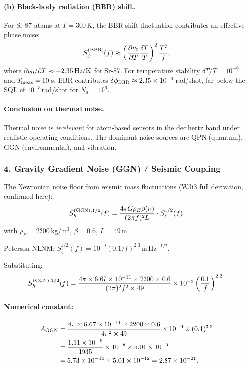 \documentclass[11pt]{article}
\theoremstyle{definition}
\theoremstyle{remark}
\newcommand{\sqrtHz}{\,\mathrm{Hz}^{-1/2}}
\newcommand{\ee}[1]{\times10^{#1}}
\begin{document}
\paragraph{(b) Black-body radiation (BBR) shift.}
For Sr-87 atoms at $T = 300$\,K, the BBR shift fluctuation contributes
an effective phase noise:
\begin{equation}
S_\phi^{(\rm BBR)}(f) \approx \left(\frac{\partial \nu_0}{\partial T}
\frac{\delta T}{T}\right)^2 \frac{T^2}{f},
\end{equation}
where $\partial\nu_0/\partial T \approx -2.35\,\rm{Hz/K}$ for Sr-87.
For temperature stability $\delta T/T = 10^{-6}$ and $T_{\rm meas} = 10$\,s,
BBR contributes $\delta\phi_{\rm BBR} \approx 2.35\ee{-6}$\,rad/shot, far below
the SQL of $10^{-3}$\,rad/shot for $N_a = 10^6$.

\paragraph{Conclusion on thermal noise.}
Thermal noise is \emph{irrelevant} for atom-based sensors in the decihertz
band under realistic operating conditions.  The dominant noise sources are
QPN (quantum), GGN (environmental), and vibration.

\subsubsection{4. Gravity Gradient Noise (GGN) / Seismic Coupling}

The Newtonian noise floor from seismic mass fluctuations (W3i3 full
derivation, confirmed here):
\begin{equation}
S_h^{(\rm GGN),1/2}(f) = \frac{4\pi G \rho_E \beta(\nu)}{(2\pi f)^2 L}
\cdot S_\xi^{1/2}(f),
\label{eq:GGN-full}
\end{equation}
with $\rho_E = 2200$\,kg/m$^3$, $\beta = 0.6$, $L = 49$\,m.

Peterson NLNM: $S_\xi^{1/2}(f) = 10^{-9}(0.1/f)^{2.3}$\,m$\sqrtHz$.

Substituting:
\begin{equation}
S_h^{(\rm GGN),1/2}(f) = \frac{4\pi \times 6.67\ee{-11} \times 2200 \times 0.6}
{(2\pi)^2 f^2 \times 49}
\times 10^{-9} \left(\frac{0.1}{f}\right)^{2.3}.
\label{eq:GGN-explicit}
\end{equation}

\paragraph{Numerical constant:}
\begin{align}
A_{\rm GGN} &= \frac{4\pi \times 6.67\ee{-11} \times 2200 \times 0.6}
{4\pi^2 \times 49}
\times 10^{-9} \times (0.1)^{2.3} \notag \\
&= \frac{1.11\ee{-6}}{1935}
\times 10^{-9} \times 5.01\ee{-3} \notag \\
&= 5.73\ee{-10} \times 5.01\ee{-12} = 2.87\ee{-21}.
\end{align}
\end{document}
